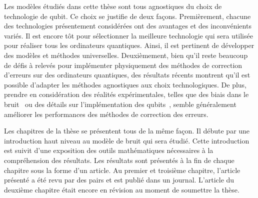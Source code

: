 Les modèles étudiés dans cette thèse sont tous agnostiques du choix de technologie de qubit.
Ce choix se justifie de deux façons.
Premièrement,
chacune des technologies présentement considérées ont des avantages et des inconvénients variés.
Il est encore tôt pour sélectionner la meilleure technologie qui sera utilisée pour réaliser
tous les ordinateurs quantiques.
Ainsi, il est pertinent de développer des modèles et méthodes universelles.
Deuxièmement,
bien qu'il reste beaucoup de défis à relevés pour implémenter physiquement des méthodes
de correction d'erreurs sur des ordinateurs quantiques,
des résultats récents montrent qu'il est possible d'adapter les méthodes agnostiques
aux choix technologiques.
De plus,
prendre en considération des réalités expérimentales,
telles que des biais dans le bruit~\cite{tuckett_ultrahigh_2018}
ou des détails sur l'implémentation des qubits~\cite{noh_fault-tolerant_2020, darmawan_practical_2021},
semble généralement améliorer les performances des méthodes de correction des erreurs.

Les chapitres de la thèse se présentent tous de la même façon.
Il débute par une introduction haut niveau au modèle de bruit qui sera étudié.
Cette introduction est suivit d'une exposition des outils mathématiques nécessaires à
la compréhension des résultats.
Les résultats sont présentés à la fin de chaque chapitre sous la forme d'un article.
Au premier et troisième chapitre,
l'article présenté a été revu par des pairs et est publié dans un journal.
L'article du deuxième chapitre était encore en révision au moment de soumettre la thèse.